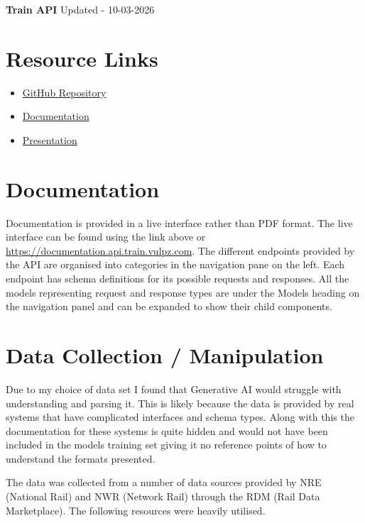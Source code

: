 \documentclass[10pt,a4paper]{article}
\begin{document}
\noindent
\Huge
\textbf{Train API}
\normalsize
\noindent
\newline
\newline
Updated - 10-03-2026

\tableofcontents

\newpage
\section{Resource Links}

\begin{itemize}
  \item \href{https://github.com/georgehester/train-api}{GitHub Repository}
  \item \href{https://documentation.api.train.vulpz.com}{Documentation}
  \item \href{https://docs.google.com/presentation/d/1i460dvt5QaJjt-JxWjruQaugBEQW9677Q9r5tmAWCv4/edit?usp=sharing}{Presentation}
\end{itemize}

\section{Documentation}

Documentation is provided in a live interface rather than PDF format. The live interface can be found using the link above or \url{https://documentation.api.train.vulpz.com}. The different endpoints provided by the API are organised into categories in the navigation pane on the left. Each endpoint has schema definitions for its possible requests and responses. All the models representing request and response types are under the Models heading on the navigation panel and can be expanded to show their child components.

\section{Data Collection / Manipulation}

Due to my choice of data set I found that Generative AI would struggle with understanding and parsing it. This is likely because the data is provided by real systems that have complicated interfaces and schema types. Along with this the documentation for these systems is quite hidden and would not have been included in the models training set giving it no reference points of how to understand the formats presented.

\noindent
\newline
The data was collected from a number of data sources provided by NRE (National Rail) and NWR (Network Rail) through the RDM (Rail Data Marketplace). The following resources were heavily utilised.
\end{document}

